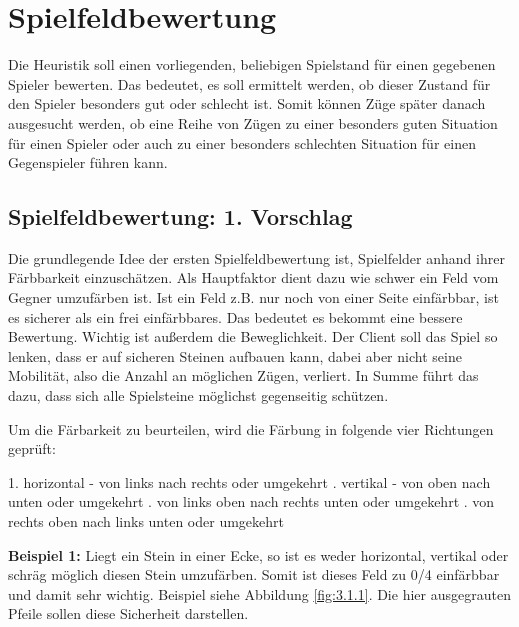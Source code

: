 \documentclass[12pt,a4paper,bibliography=totocnumbered,listof=totocnumbered]{scrartcl}
\begin{document}
	\newpage

    \section{Spielfeldbewertung}
    \vspace{1em}
    Die Heuristik soll einen vorliegenden, beliebigen Spielstand für einen gegebenen Spieler bewerten. Das bedeutet, es soll ermittelt werden, ob dieser Zustand für den Spieler besonders gut oder schlecht ist. Somit können Züge später danach ausgesucht werden, ob eine Reihe von Zügen zu einer besonders guten Situation für einen Spieler oder auch zu einer besonders schlechten Situation für einen Gegenspieler führen kann.
    
    \subsection{Spielfeldbewertung: 1. Vorschlag}
    \vspace{1em}
	Die grundlegende Idee der ersten Spielfeldbewertung ist, Spielfelder anhand ihrer \glqq Färbbarkeit\grqq{} einzuschätzen. Als Hauptfaktor dient dazu wie schwer ein Feld vom Gegner umzufärben ist. Ist ein Feld z.B. nur noch von einer Seite einfärbbar, ist es sicherer als ein frei einfärbbares. Das bedeutet es bekommt eine bessere Bewertung. Wichtig ist außerdem die Beweglichkeit. Der Client soll das Spiel so lenken, dass er auf sicheren Steinen aufbauen kann, dabei aber nicht seine Mobilität, also die Anzahl an möglichen Zügen, verliert. In Summe führt das dazu, dass sich alle Spielsteine möglichst gegenseitig schützen.


    Um die Färbarkeit zu beurteilen, wird die Färbung in folgende vier Richtungen geprüft:

    1. horizontal - von links nach rechts oder umgekehrt . vertikal - von oben nach unten oder umgekehrt . von links oben nach rechts unten oder umgekehrt . von rechts oben nach links unten oder umgekehrt \newline

    \textbf{Beispiel 1:} Liegt ein Stein in einer Ecke, so ist es weder horizontal, vertikal oder schräg möglich diesen Stein umzufärben. Somit ist dieses Feld zu 0/4 einfärbbar und damit sehr wichtig. Beispiel siehe Abbildung \ref{fig:3.1.1}. Die hier ausgegrauten Pfeile sollen diese Sicherheit darstellen.
\end{document}
